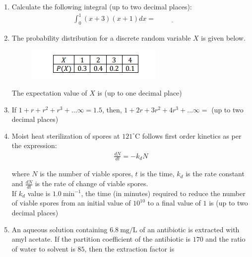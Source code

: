 \documentclass[journal,12pt,onecolumn]{IEEEtran}
\theoremstyle{remark}
\begin{document}
\begin{enumerate}
    \item Calculate the following integral (up to two decimal places):
    \begin{align*}
        \int_0^1 (x+3)(x+1) dx = \underline{\hspace{2cm}}
    \end{align*}
    
    \item The probability distribution for a discrete random variable $X$ is given below.
   \begin{figure}[H]
    \centering
    \includegraphics[width = 0.4\columnwidth]{fig/Q42.png}
    \caption*{}
    \label{fig:Q42}
\end{figure}
   
    The expectation value of $X$ is (up to one decimal place) \underline{\hspace{2cm}}

    \item If $1 + r + r^2 + r^3 + \dots \infty = 1.5$,
    then, $1 + 2r + 3r^2 + 4r^3 + \dots \infty = $ (up to two decimal places) \underline{\hspace{2cm}}
    \item Moist heat sterilization of spores at $121^\circ$C follows first order kinetics as per the expression:
    \begin{align*}
        \frac{dN}{dt} = -k_d N
    \end{align*}
        
    
    where $N$ is the number of viable spores, $t$ is the time, $k_d$ is the rate constant and $\frac{dN}{dt}$ is the rate of change of viable spores.\\
    If $k_d$ value is $1.0\ \text{min}^{-1}$, the time (in minutes) required to reduce the number of viable spores from an initial value of $10^{10}$ to a final value of $1$ is (up to two decimal places) \underline{\hspace{2cm}}
    
    \item An aqueous solution containing $6.8\ \text{mg/L}$ of an antibiotic is extracted with amyl acetate. If the partition coefficient of the antibiotic is $170$ and the ratio of water to solvent is $85$, then the extraction factor is \underline{\hspace{2cm}}
    

\end{enumerate}
\end{document}
